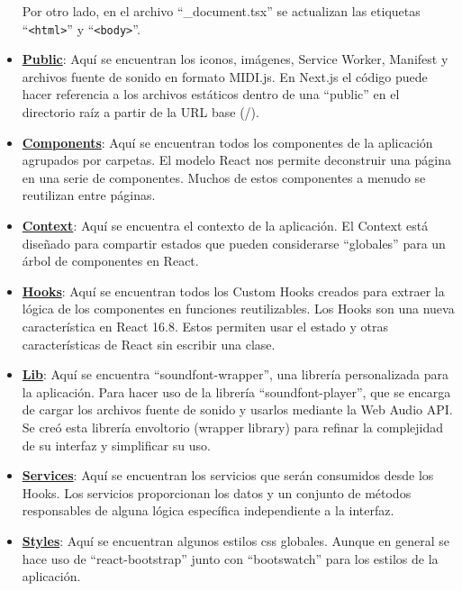 \documentclass[12pt,twoside,titlepage]{report}
\begin{document}
\begin{itemize}
    Por otro lado, en el archivo ``\_document.tsx'' se actualizan las etiquetas ``\texttt{<html>}'' y ``\texttt{<body>}''.
    \item \href{https://github.com/alberttogoca/EarFit/tree/main/public}{\textbf{Public}}: Aquí se encuentran los iconos, imágenes, Service Worker, Manifest y archivos fuente de sonido en formato MIDI.js. En Next.js el código puede hacer referencia a los archivos estáticos dentro de una ``public'' en el directorio raíz a partir de la URL base (/).
    \item \href{https://github.com/alberttogoca/EarFit/tree/main/src/components}{\textbf{Components}}: Aquí se encuentran todos los componentes de la aplicación agrupados por carpetas. El modelo React nos permite deconstruir una página en una serie de componentes. Muchos de estos componentes a menudo se reutilizan entre páginas.
    \item \href{https://github.com/alberttogoca/EarFit/tree/main/src/context}{\textbf{Context}}: Aquí se encuentra el contexto de la aplicación. El Context está diseñado para compartir estados que pueden considerarse “globales” para un árbol de componentes en React. %
    \item \href{https://github.com/alberttogoca/EarFit/tree/main/src/hooks}{\textbf{Hooks}}: Aquí se encuentran todos los Custom Hooks creados para extraer la lógica de los componentes en funciones reutilizables. Los Hooks son una nueva característica en React 16.8. Estos permiten usar el estado y otras características de React sin escribir una clase.
    \item \href{https://github.com/alberttogoca/EarFit/tree/main/src/lib}{\textbf{Lib}}: Aquí se encuentra ``soundfont-wrapper'', una librería personalizada para la aplicación. Para hacer uso de la librería ``soundfont-player'', que se encarga de cargar los archivos fuente de sonido y usarlos mediante la Web Audio API. Se creó esta librería envoltorio (wrapper library) para refinar la complejidad de su interfaz y simplificar su uso.
    \item \href{https://github.com/alberttogoca/EarFit/tree/main/src/services}{\textbf{Services}}: Aquí se encuentran los servicios que serán consumidos desde los Hooks. Los servicios proporcionan los datos y un conjunto de métodos responsables de alguna lógica específica independiente a la interfaz.
    \item \href{https://github.com/alberttogoca/EarFit/tree/main/src/styles}{\textbf{Styles}}: Aquí se encuentran algunos estilos css globales. Aunque en general se hace uso de ``react-bootstrap'' junto con ``bootswatch'' para los estilos de la aplicación.

\end{itemize}
\end{document}
